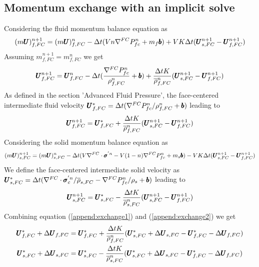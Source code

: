 \documentclass[preprint,12pt]{elsarticle}
\begin{document}
\subsection{\textsf{Momentum exchange with an implicit solve}}
%
%
Considering the fluid momentum balance equation as 
%
\begin{equation}
  (m\pmb{U})_{f,FC}^{n+1} =  (m\pmb{U})_{f,FC}^{n} - \Delta{t} (V n \nabla^{FC} P_{fc}^{n} + m_f \pmb{b}) + V K \Delta{t} (\pmb{U}_{s,FC}^{n+1} - \pmb{U}_{f,FC}^{n+1})
\end{equation}
%
%
Assuming $m_{f,FC}^{n+1} = m_{f,FC}^n$ we get
%
\begin{equation}
  \pmb{U}_{f,FC}^{n+1} =  \pmb{U}_{f,FC}^{n} - \Delta{t} (\frac{\nabla^{FC} P_{fc}^{n}} {\rho_{f,FC}^n} + \pmb{b}) + \frac{\Delta{t} K}{\overline{\rho}_{f,FC}^n} (\pmb{U}_{s,FC}^{n+1} - \pmb{U}_{f,FC}^{n+1})
\end{equation}
%
%
As defined in the section 'Advanced Fluid Pressure', the face-centered intermediate fluid velocity $\pmb{U}_{f,FC}^{*} = \Delta{t} (\nabla^{FC} P_{fc}^{n} / \rho_{f,FC}^n + \pmb{b})$ leading to
%
\begin{equation}
\label{append:exchange1}
  \pmb{U}_{f,FC}^{n+1} =  \pmb{U}_{f,FC}^{*} +  \frac{\Delta{t} K}{\overline{\rho}_{f,FC}^n} (\pmb{U}_{s,FC}^{n+1} - \pmb{U}_{f,FC}^{n+1})
\end{equation}
%
%
Considering the solid momentum balance equation as
%
\begin{equation}
  (m\pmb{U})_{s,FC}^{n+1} =  (m\pmb{U})_{s,FC}^{n} - \Delta{t} (V \nabla^{FC} \cdot \pmb{\sigma}^{'n} - V (1-n) \nabla^{FC} P_{fc}^{n} + m_s \pmb{b}) - V K \Delta{t} (\pmb{U}_{s,FC}^{n+1} - \pmb{U}_{f,FC}^{n+1})
\end{equation}
%
%
We define the face-centered intermediate solid velocity as $\pmb{U}_{s,FC}^{*} = \Delta{t} (\nabla^{FC} \cdot \pmb{\sigma}_c^{'n} / \overline{\rho}_{s,FC}  - \nabla^{FC} P_{fc}^{n} / \rho_s + \pmb{b})$ leading to
%
\begin{equation}
\label{append:exchange2}
  \pmb{U}_{s,FC}^{n+1} =  \pmb{U}_{s,FC}^{*} -  \frac{\Delta{t} K}{\overline{\rho}_{s,FC}^n} (\pmb{U}_{s,FC}^{n+1} - \pmb{U}_{f,FC}^{n+1})
\end{equation}
%
%
Combining equation (\ref{append:exchange1}) and (\ref{append:exchange2}) we get
%
\begin{equation}
\begin{gathered}
\label{append:exchange3}
  \pmb{U}_{f,FC}^{*} + \Delta \pmb{U}_{f,FC} =  \pmb{U}_{f,FC}^{*} +  \frac{\Delta{t} K}{\overline{\rho}_{f,FC}^n} (\pmb{U}_{s,FC}^{*} + \Delta \pmb{U}_{s,FC} - \pmb{U}_{f,FC}^{*} - \Delta \pmb{U}_{f,FC}) \\
  \pmb{U}_{s,FC}^{*} + \Delta \pmb{U}_{s,FC} =  \pmb{U}_{s,FC}^{*} -  \frac{\Delta{t} K}{\overline{\rho}_{s,FC}^n} (\pmb{U}_{s,FC}^{*} + \Delta \pmb{U}_{s,FC} - \pmb{U}_{f,FC}^{*} - \Delta \pmb{U}_{f,FC})
\end{gathered}
\end{equation}
\end{document}

